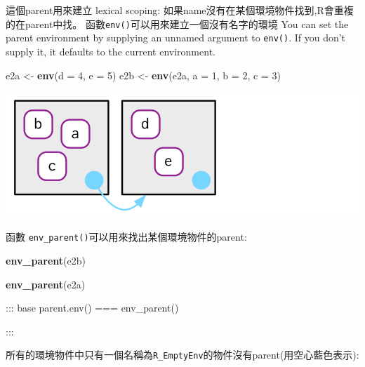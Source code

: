 \documentclass[]{book}
\newenvironment{Shaded}{\begin{snugshade}}{\end{snugshade}}
\newcommand{\KeywordTok}[1]{\textcolor[rgb]{0.13,0.29,0.53}{\textbf{#1}}}
\newcommand{\DataTypeTok}[1]{\textcolor[rgb]{0.13,0.29,0.53}{#1}}
\newcommand{\DecValTok}[1]{\textcolor[rgb]{0.00,0.00,0.81}{#1}}
\newcommand{\StringTok}[1]{\textcolor[rgb]{0.31,0.60,0.02}{#1}}
\newcommand{\NormalTok}[1]{#1}
\theoremstyle{definition}
\theoremstyle{definition}
\theoremstyle{definition}
\theoremstyle{remark}
\begin{document}
這個parent用來建立 lexical scoping:
如果name沒有在某個環境物件找到,R會重複的在parent中找。
函數\texttt{env()}可以用來建立一個沒有名字的環境 You can set the parent
environment by supplying an unnamed argument to \texttt{env()}. If you
don't supply it, it defaults to the current environment.

\begin{Shaded}
\begin{Highlighting}[]
\NormalTok{e2a <-}\StringTok{ }\KeywordTok{env}\NormalTok{(}\DataTypeTok{d =} \DecValTok{4}\NormalTok{, }\DataTypeTok{e =} \DecValTok{5}\NormalTok{)}
\NormalTok{e2b <-}\StringTok{ }\KeywordTok{env}\NormalTok{(e2a, }\DataTypeTok{a =} \DecValTok{1}\NormalTok{, }\DataTypeTok{b =} \DecValTok{2}\NormalTok{, }\DataTypeTok{c =} \DecValTok{3}\NormalTok{)}
\end{Highlighting}
\end{Shaded}

\begin{center}\includegraphics{diagrams/environments/parents} \end{center}

函數 \texttt{env\_parent()}可以用來找出某個環境物件的parent:

\begin{Shaded}
\begin{Highlighting}[]
\KeywordTok{env_parent}\NormalTok{(e2b)}
\end{Highlighting}
\end{Shaded}

\begin{Shaded}
\begin{Highlighting}[]
\KeywordTok{env_parent}\NormalTok{(e2a)}
\end{Highlighting}
\end{Shaded}

::: base parent.env() === env\_parent()

:::

所有的環境物件中只有一個名稱為\texttt{R\_EmptyEnv}的物件沒有parent(用空心藍色表示):
\end{document}

